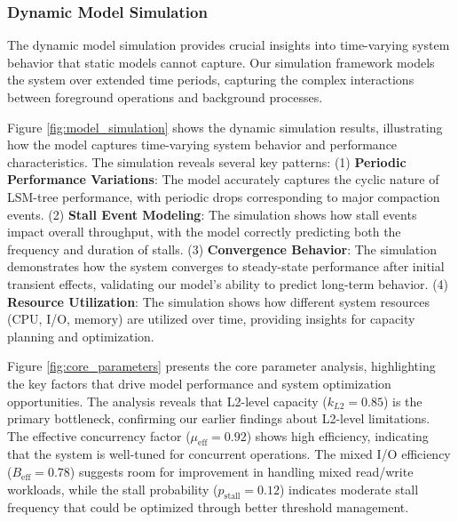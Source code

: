 \documentclass[11pt]{article}
\begin{document}
\subsubsection{Dynamic Model Simulation}
The dynamic model simulation provides crucial insights into time-varying system behavior that static models cannot capture. Our simulation framework models the system over extended time periods, capturing the complex interactions between foreground operations and background processes.

Figure \ref{fig:model_simulation} shows the dynamic simulation results, illustrating how the model captures time-varying system behavior and performance characteristics. The simulation reveals several key patterns: (1) \textbf{Periodic Performance Variations}: The model accurately captures the cyclic nature of LSM-tree performance, with periodic drops corresponding to major compaction events. (2) \textbf{Stall Event Modeling}: The simulation shows how stall events impact overall throughput, with the model correctly predicting both the frequency and duration of stalls. (3) \textbf{Convergence Behavior}: The simulation demonstrates how the system converges to steady-state performance after initial transient effects, validating our model's ability to predict long-term behavior. (4) \textbf{Resource Utilization}: The simulation shows how different system resources (CPU, I/O, memory) are utilized over time, providing insights for capacity planning and optimization.

Figure \ref{fig:core_parameters} presents the core parameter analysis, highlighting the key factors that drive model performance and system optimization opportunities. The analysis reveals that L2-level capacity ($k_{L2} = 0.85$) is the primary bottleneck, confirming our earlier findings about L2-level limitations. The effective concurrency factor ($\mu_{\text{eff}} = 0.92$) shows high efficiency, indicating that the system is well-tuned for concurrent operations. The mixed I/O efficiency ($B_{\text{eff}} = 0.78$) suggests room for improvement in handling mixed read/write workloads, while the stall probability ($p_{\text{stall}} = 0.12$) indicates moderate stall frequency that could be optimized through better threshold management.
\end{document}
